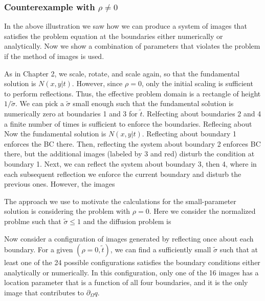 \documentclass[10pt]{article}
\begin{document}


\subsubsection{Counterexample with $\rho \neq 0$}
In the above illustration we saw how we can produce a system of images
that satisfies the problem equation at the boundaries either
numerically or analytically. Now we show a combination of parameters
that violates the problem if the method of images is used.

As in Chapter 2, we scale, rotate, and scale
again, so that the fundamental solution is $N(x,y|t)$. However, since
$\rho=0$, only the initial scaling is sufficient to perform
reflections. Thus, the effective problem domain is a rectangle of
height $1/\tilde{\sigma}$. We can pick a $\tilde{\sigma}$ small enough
such that the fundamental solution is numerically zero at boundaries 1
and 3 for $\tilde{t}$. Relfecting about boundaries 2 and 4 a finite
number of times is sufficient to enforce the boundaries. Reflecing about Now the fundamental solution is
$N(x,y|t)$. Reflecting about boundary 1 enforces the BC there. Then,
reflecting the system about boundary 2 enforces BC there, but the
additional images (labeled by 3 and red) disturb the condition at
boundary 1. Next, we can reflect the system about boundary 3, then 4,
where in each subsequent reflection we enforce the current boundary
and disturb the previous ones. However, the images

The approach we use to motivate the calculations for the
small-parameter solution is considering the problem with
$\rho=0$. Here we consider the normalized problme such that
$\tilde{\sigma} \leq 1$ and the diffusion problem is

Now consider a configuration of images generated by reflecting once
about each boundary. For a given $(\rho=0, \tilde{t})$, we can find a
sufficiently small $\tilde{\sigma}$ such that at least one of the 24
possible configurations satisfies the boundary conditions either
analytically or numerically. In this configuration, only one of the 16
images has a location parameter that is a function of all four
boundaries, and it is the only image that contributes to
$\partial_{\Omega} q$.
\end{document}
